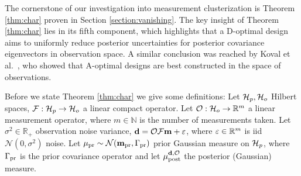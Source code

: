 \begin{enumerate}




\end{enumerate}

The cornerstone of our investigation into measurement clusterization
is Theorem \ref{thm:char} proven in Section
\ref{section:vanishing}. The key insight of Theorem \ref{thm:char}
lies in its fifth component, which highlights that a D-optimal design
aims to uniformly reduce posterior uncertainties for posterior
covariance eigenvectors in observation space. A similar conclusion was
reached by Koval et al.~\cite{koval2020}, who showed that A-optimal
designs are best constructed in the space of observations.

Before we state Theorem \ref{thm:char} we give some definitions: Let
\(\mathcal{H}_p, \mathcal{H}_o\) Hilbert spaces, \(\mathcal{F}:\mathcal{H}_p \to \mathcal{H}_o\) a linear
compact operator. Let \(\mathcal{O}: \mathcal{H}_o \to \mathbb{R}^m\) a linear
measurement operator, where \(m \in \mathbb{N}\) is the number of
measurements taken. Let \(\sigma^2 \in \mathbb{R}_{+}\) observation
noise variance, \(\mathbf{d} = \mathcal{O} \mathcal{F} \mathbf{m} + \varepsilon\), where \(\varepsilon \in
\mathbb{R}^m\) is iid \(\mathcal{N}(0, \sigma^2)\) noise. Let \(\mu_{\textup{pr}}
\sim \mathcal{N}(\mathbf{m}_{\textup{pr}}, \Gamma_{\textup{pr}})\) prior Gaussian measure on
\(\mathcal{H}_p\), where \(\Gamma_{\textup{pr}}\) is the prior covariance operator and let
\(\mu_{\textup{post}}^{\mathbf{d}, \mathcal{O}}\) the posterior (Gaussian) measure.
  
